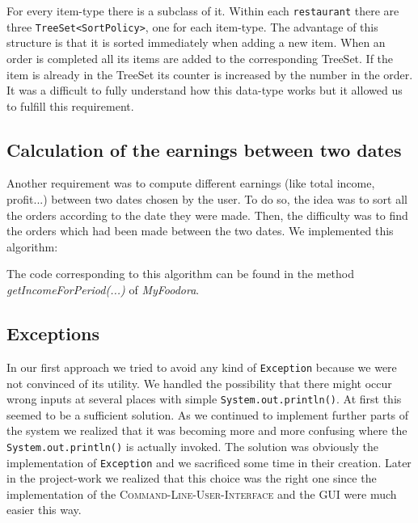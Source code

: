 

For every item-type there is a subclass of it. Within each 
\lstinline|restaurant| there are three \lstinline|TreeSet<SortPolicy>|, one for each 
item-type. The advantage of this structure is that it is sorted immediately when adding a new 
item. When an order is completed all its items are added to the corresponding TreeSet.
If the item is already in the TreeSet its counter is increased by the number in the 
order. It was a difficult to fully understand how this data-type works but it allowed us
to fulfill this requirement.

\subsection{Calculation of the earnings between two dates}
\label{calculation-between-2-dates}
Another requirement was to compute different earnings (like total income, profit...) between two dates chosen by the user. To do so, the idea was to sort all the orders according to the date they were made. Then, the difficulty was to find the orders which had been made between the two dates. We implemented this algorithm:

The code corresponding to this algorithm can be found in the method \textit{getIncomeForPeriod(...)} of \textit{MyFoodora}.

\subsection{Exceptions}
\label{sub:exceptions}

In our first approach we tried to avoid any kind of \lstinline|Exception| because we were
not convinced of its utility. We handled the possibility that there might occur wrong inputs at
several places with simple \lstinline|System.out.println()|. At first this seemed to be a
sufficient solution. As we continued to implement further parts of the system we realized that it
was becoming more and more confusing where the \lstinline|System.out.println()| is actually 
invoked. The solution was obviously the implementation of \lstinline|Exception| and we sacrificed
some time in their creation. Later in the project-work we realized that this choice was the right
one since the implementation of the \textsc{Command-Line-User-Interface} and the \textsc{GUI} were
much easier this way.

